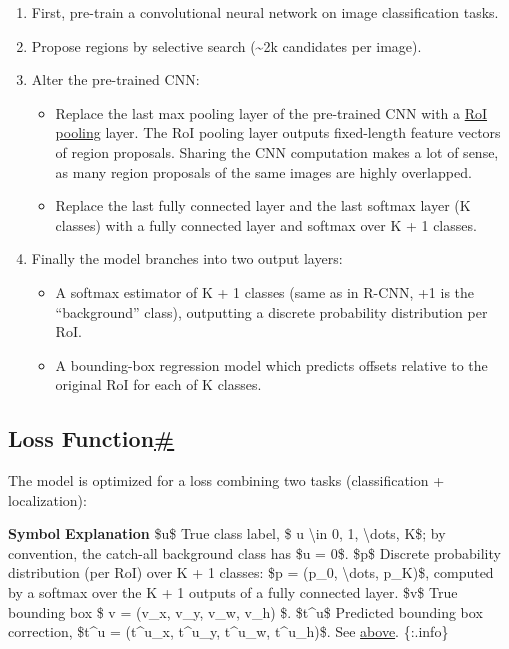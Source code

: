 \begin{enumerate}
\tightlist
\item
  First, pre-train a convolutional neural network on image classification tasks.
\item
  Propose regions by selective search (\textasciitilde2k candidates per image).
\item
  Alter the pre-trained CNN:

  \begin{itemize}
  \tightlist
  \item
    Replace the last max pooling layer of the pre-trained CNN with a \hyperref[roi-pooling]{RoI pooling} layer. The RoI pooling layer outputs fixed-length feature vectors of region proposals. Sharing the CNN computation makes a lot of sense, as many region proposals of the same images are highly overlapped.
  \item
    Replace the last fully connected layer and the last softmax layer (K classes) with a fully connected layer and softmax over K + 1 classes.
  \end{itemize}
\item
  Finally the model branches into two output layers:

  \begin{itemize}
  \tightlist
  \item
    A softmax estimator of K + 1 classes (same as in R-CNN, +1 is the ``background'' class), outputting a discrete probability distribution per RoI.
  \item
    A bounding-box regression model which predicts offsets relative to the original RoI for each of K classes.
  \end{itemize}
\end{enumerate}

\subsection{\texorpdfstring{Loss Function\hyperref[loss-function]{\#}}{Loss Function\#}}\label{loss-function}

The model is optimized for a loss combining two tasks (classification + localization):

\textbar{} \textbf{Symbol} \textbar{} \textbf{Explanation} \textbar{} \textbar{} \$u\$ \textbar{} True class label, \$ u \textbackslash in 0, 1, \textbackslash dots, K\$; by convention, the catch-all background class has \$u = 0\$. \textbar{} \textbar{} \$p\$ \textbar{} Discrete probability distribution (per RoI) over K + 1 classes: \$p = (p\_0, \textbackslash dots, p\_K)\$, computed by a softmax over the K + 1 outputs of a fully connected layer. \textbar{} \textbar{} \$v\$ \textbar{} True bounding box \$ v = (v\_x, v\_y, v\_w, v\_h) \$. \textbar{} \textbar{} \$t\^{}u\$ \textbar{} Predicted bounding box correction, \$t\^{}u = (t\^{}u\_x, t\^{}u\_y, t\^{}u\_w, t\^{}u\_h)\$. See \hyperref[bounding-box-regression]{above}. \textbar{} \{:.info\}

